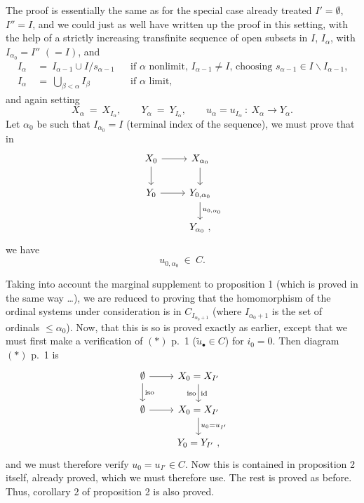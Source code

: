 The proof is essentially the same as for the special case already treated $I' = \emptyset$, $I'' = I$, and we could just as well have written up the proof in this setting, with the help of a strictly increasing transfinite sequence of open subsets in $I$, $I_\alpha$, with  $I_{\alpha_0} = I''$ $(= I)$, and
\[
\begin{aligned}
I_\alpha \ &= \ I_{\alpha-1} \cup I/s_{\alpha-1} && \text{if $\alpha$ nonlimit, $I_{\alpha-1} \neq I$, choosing $s_{\alpha-1} \in I \backslash I_{\alpha-1}$,} \\
I_\alpha \ &= \ \textstyle\bigcup_{\beta<\alpha} I_\beta && \text{if $\alpha$ limit,}
\end{aligned}
\]
and again setting
\[
X_\alpha \ = \ X_{I_\alpha}, \qquad Y_\alpha \ = \ Y_{I_\alpha}, \qquad u_\alpha = u_{I_\alpha} \ : \ X_\alpha \longrightarrow Y_\alpha.
\]
Let $\alpha_0$ be such that $I_{\alpha_0} = I$ (terminal index of the sequence), we must prove that in
\[
\begin{tikzcd}
X_0 \arrow[r] \arrow[d] & X_{\alpha_0} \arrow[d] \\
Y_0 \arrow[r] & Y_{0,\alpha_0} \arrow[d, "u_{0,\alpha_0}"] \\
 & Y_{\alpha_0}\ ,
\end{tikzcd}
\]
 we have
\[
u_{0,\alpha_0} \ \in \ C.
\]

Taking into account the marginal supplement to proposition 1 (which is proved in the same way \ldots), we are reduced to proving that the homomorphism of the ordinal systems under consideration is in $C_{I_{\alpha_0+1}}$ (where $I_{\alpha_0+1}$ is the set of ordinals $\leq \alpha_0$). Now, that this is so is proved exactly as earlier, except that we must first make a verification of $(*)$ p.~1 ($\tilde{u}_\bullet \in C$) for $i_0 = 0$. Then diagram $(*)$ p.~1 is
\[
\begin{tikzcd}
\emptyset \arrow[r] \arrow[d, "\mathrm{iso}"] & X_0 = X_{I'} \arrow[d, "\mathrm{iso}"', "\mathrm{id}"] \\
\emptyset \arrow[r] & X_0 = X_{I'} \arrow[d, "u_0 = u_{I'}"] \\
 & Y_0 = Y_{I'}\ ,
\end{tikzcd}
\]
and we must therefore verify $u_0 = u_{I'} \in C$. Now this is contained in proposition 2 itself, already proved, which we must therefore use. %
The rest is proved as before. Thus, corollary 2 of proposition 2 is also proved.

